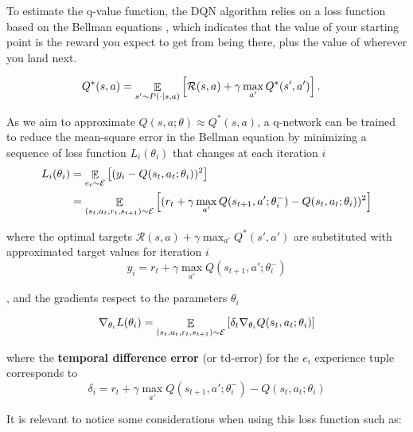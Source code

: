 To estimate the q-value function, the DQN algorithm relies on a loss function based on the Bellman equations \cite{sutton2018reinforcement}, which indicates that the value of your starting point is the reward you expect to get from being there, plus the value of wherever you land next.

\begin{align*}
Q^*(s,a) &= \mathop{\mathbb{E}}\limits_{s'\sim P(\cdot | s,a)}\left[\mathcal{R}(s,a) + \gamma \max_{a'} Q^*(s',a')\right].
\end{align*}

As we aim to approximate $Q(s, a; \theta) \approx Q^*(s, a)$, a q-network can be trained to reduce the mean-square error in the Bellman equation by minimizing a sequence of loss function $L_i(\theta_i)$ that changes at each iteration $i$
\begin{align*}
    L_i (\theta_i) & = \mathop{\mathbb{E}}\limits_{e_t \sim \mathcal{E}}\left[(y_i - Q(s_t, a_t; \theta_i))^2\right] \\
    & = \mathop{\mathbb{E}}\limits_{(s_t, a_t, r_t, s_{t+1}) \sim \mathcal{E}}\left[(r_t + \gamma \max_{a'} Q(s_{t+1}, a'; \theta^-_{i}) - Q(s_t, a_t; \theta_i))^2\right] 
\end{align*}

where the optimal targets $\mathcal{R}(s,a) + \gamma \max_{a'} Q^*(s',a')$ are substituted with approximated target values for iteration $i$
\begin{equation}
    y_i = r_t + \gamma \max_{a'} Q(s_{t+1}, a'; \theta^-_{i})
\end{equation}

, and the gradients respect to the parameters $\theta_i$

\begin{equation}
    \nabla_{\theta_i} L(\theta_i) = \mathop{\mathbb{E}}\limits_{(s_t, a_t, r_t, s_{t+1}) \sim \mathcal{E}}\left[ \delta_t \nabla_{\theta_i}Q(s_t, a_t; \theta_i)\right] 
\end{equation}

where the \textbf{temporal difference error} (or td-error) for the $e_i$ experience tuple corresponds to
\begin{equation}
    \delta_i = r_t + \gamma \max_{a'} Q(s_{t+1}, a'; \theta^-_{i}) - Q(s_t, a_t; \theta_i)
\end{equation}

It is relevant to notice some considerations when using this loss function such as:

